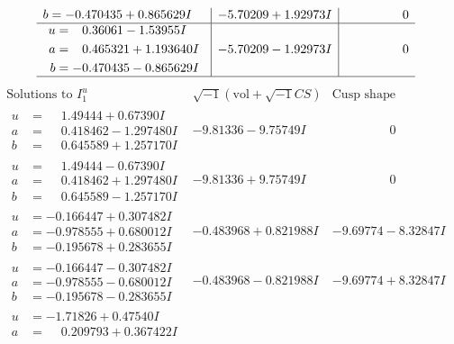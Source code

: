 \documentclass[1p]{elsarticle_modified}
\theoremstyle{definition}
\newcommand{\I}{\sqrt{-1}}
\begin{document}
$$\begin{array}{c|c|c}
\begin{aligned}
b &= -0.470435 + 0.865629 I\end{aligned}
 & -5.70209 + 1.92973 I & \phantom{-0.000000 } 0 \\ \hline\begin{aligned}
u &= \phantom{-}0.36061 - 1.53955 I \\
a &= \phantom{-}0.465321 + 1.193640 I \\
b &= -0.470435 - 0.865629 I\end{aligned}
 & -5.70209 - 1.92973 I & \phantom{-0.000000 } 0\\
 \hline 
 \end{array}$$\newpage$$\begin{array}{c|c|c}  
\text{Solutions to }I^u_{1}& \I (\text{vol} + \sqrt{-1}CS) & \text{Cusp shape}\\
 \hline 
\begin{aligned}
u &= \phantom{-}1.49444 + 0.67390 I \\
a &= \phantom{-}0.418462 - 1.297480 I \\
b &= \phantom{-}0.645589 + 1.257170 I\end{aligned}
 & -9.81336 - 9.75749 I & \phantom{-0.000000 } 0 \\ \hline\begin{aligned}
u &= \phantom{-}1.49444 - 0.67390 I \\
a &= \phantom{-}0.418462 + 1.297480 I \\
b &= \phantom{-}0.645589 - 1.257170 I\end{aligned}
 & -9.81336 + 9.75749 I & \phantom{-0.000000 } 0 \\ \hline\begin{aligned}
u &= -0.166447 + 0.307482 I \\
a &= -0.978555 + 0.680012 I \\
b &= -0.195678 + 0.283655 I\end{aligned}
 & -0.483968 + 0.821988 I & -9.69774 - 8.32847 I \\ \hline\begin{aligned}
u &= -0.166447 - 0.307482 I \\
a &= -0.978555 - 0.680012 I \\
b &= -0.195678 - 0.283655 I\end{aligned}
 & -0.483968 - 0.821988 I & -9.69774 + 8.32847 I \\ \hline\begin{aligned}
u &= -1.71826 + 0.47540 I \\
a &= \phantom{-}0.209793 + 0.367422 I \\

\end{aligned}
\end{array}$$
\end{document}

